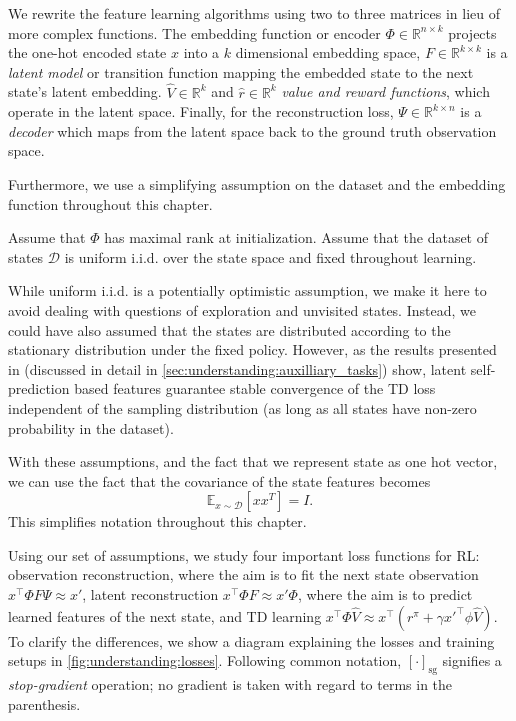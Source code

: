 We rewrite the feature learning algorithms using two to three matrices in lieu of more complex functions. 
The embedding function or encoder $\Phi \in \mathbb{R}^{n \times k}$ projects the one-hot encoded state $x$ into a $k$ dimensional embedding space,
$F \in \mathbb{R}^{k\times k}$ is a \emph{latent model} or transition function mapping the embedded state to the next state's latent embedding.
$\hat{V} \in \mathbb{R}^{k}$ and $\hat{r} \in \mathbb{R}^{k}$ \emph{value and reward functions}, which operate in the latent space.
Finally, for the reconstruction loss, $\Psi \in \mathbb{R}^{k \times n}$ is a \emph{decoder} which maps from the latent space back to the ground truth observation space.

Furthermore, we use a simplifying assumption on the dataset and the embedding function throughout this chapter.
\begin{assumption}
\label{assumption:understanding:1}
Assume that $\Phi$ has maximal rank at initialization.
Assume that the dataset of states $\mathcal{D}$ is uniform i.i.d. over the state space and fixed throughout learning.
\end{assumption}
While uniform i.i.d. is a potentially optimistic assumption, we make it here to avoid dealing with questions of exploration and unvisited states.
Instead, we could have also assumed that the states are distributed according to the stationary distribution under the fixed policy.
However, as the results presented in \textcite{ghosh2020representations} (discussed in detail in \autoref{sec:understanding:auxilliary_tasks}) show, latent self-prediction based features guarantee stable convergence of the TD loss independent of the sampling distribution (as long as all states have non-zero probability in the dataset).

With these assumptions, and the fact that we represent state as one hot vector, we can use the fact that the covariance of the state features becomes $$\mathbb{E}_{x\sim \mathcal{D}}[xx^T] = I.$$
This simplifies notation throughout this chapter.

Using our set of assumptions, we study four important loss functions for RL: observation reconstruction, where the aim is to fit the next state observation $x^\top \Phi F \Psi \approx x'$, latent reconstruction $x^\top \Phi F \approx x' \Phi$, where the aim is to predict learned features of the next state, and TD learning $x^\top \Phi \hat{V} \approx x^\top(r^\pi + \gamma x'^\top\phi \hat{V})$. To clarify the differences, we show a diagram explaining the losses and training setups in \autoref{fig:understanding:losses}.
Following common notation, $[\cdot]_\mathrm{sg}$ signifies a \emph{stop-gradient} operation; no gradient is taken with regard to terms in the parenthesis.

